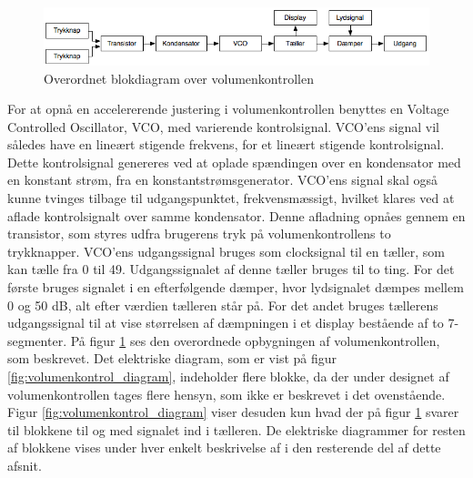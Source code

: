 \begin{figure}[h]
\centering
\includegraphics[scale=0.5]{teknisk/volumenkontrol/blokdiagram-volumenkontrol.png}
\caption{Overordnet blokdiagram over volumenkontrollen}
\label{fig:blokdiagram_volumenkontrol}
\end{figure}

For at opnå en accelererende justering i volumenkontrollen benyttes en Voltage Controlled Oscillator, VCO, med varierende kontrolsignal. VCO'ens signal vil således have en lineært stigende frekvens, for et lineært stigende kontrolsignal. Dette kontrolsignal genereres ved at oplade spændingen over en kondensator med en konstant strøm, fra en konstantstrømsgenerator. VCO'ens signal skal også kunne tvinges tilbage til udgangspunktet, frekvensmæssigt, hvilket klares ved at aflade kontrolsignalt over samme kondensator. Denne afladning opnåes gennem en transistor, som styres udfra brugerens tryk på volumenkontrollens to trykknapper. VCO'ens udgangssignal bruges som clocksignal til en tæller, som kan tælle fra 0 til 49. Udgangssignalet af denne tæller bruges til to ting. For det første bruges signalet i en efterfølgende dæmper, hvor lydsignalet dæmpes mellem 0 og 50 dB, alt efter værdien tælleren står på. For det andet bruges tællerens udgangssignal til at vise størrelsen af dæmpningen i et display bestående af to 7-segmenter.
På figur \ref{fig:blokdiagram_volumenkontrol} ses den overordnede opbygningen af volumenkontrollen, som beskrevet. Det elektriske diagram, som er vist på figur \ref{fig:volumenkontrol_diagram}, indeholder flere blokke, da der under designet af volumenkontrollen tages flere hensyn, som ikke er beskrevet i det ovenstående. Figur \ref{fig:volumenkontrol_diagram} viser desuden kun hvad der på figur \ref{fig:blokdiagram_volumenkontrol} svarer til blokkene til og med signalet ind i tælleren. De elektriske diagrammer for resten af blokkene vises under hver enkelt beskrivelse af i den resterende del af dette afsnit.
